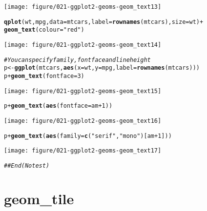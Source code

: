 \documentclass[a4paper,titlepage]{tufte-handout}\usepackage[]{graphicx}\usepackage[]{color}
\makeatletter
\def\maxwidth{ %
  \ifdim\Gin@nat@width>\linewidth
    \linewidth
  \else
    \Gin@nat@width
  \fi
}
\newcommand{\hlnum}[1]{\textcolor[rgb]{0.686,0.059,0.569}{#1}}%
\newcommand{\hlstr}[1]{\textcolor[rgb]{0.192,0.494,0.8}{#1}}%
\newcommand{\hlcom}[1]{\textcolor[rgb]{0.678,0.584,0.686}{\textit{#1}}}%
\newcommand{\hlopt}[1]{\textcolor[rgb]{0,0,0}{#1}}%
\newcommand{\hlstd}[1]{\textcolor[rgb]{0.345,0.345,0.345}{#1}}%
\newcommand{\hlkwb}[1]{\textcolor[rgb]{0.69,0.353,0.396}{#1}}%
\newcommand{\hlkwc}[1]{\textcolor[rgb]{0.333,0.667,0.333}{#1}}%
\newcommand{\hlkwd}[1]{\textcolor[rgb]{0.737,0.353,0.396}{\textbf{#1}}}%
\newenvironment{kframe}{%
 \def\at@end@of@kframe{}%
 \ifinner\ifhmode%
  \def\at@end@of@kframe{\end{minipage}}%
  \begin{minipage}{\columnwidth}%
 \fi\fi%
 \def\FrameCommand##1{\hskip\@totalleftmargin \hskip-\fboxsep
 \colorbox{shadecolor}{##1}\hskip-\fboxsep
     \hskip-\linewidth \hskip-\@totalleftmargin \hskip\columnwidth}%
 \MakeFramed {\advance\hsize-\width
   \@totalleftmargin\z@ \linewidth\hsize
   \@setminipage}}%
 {\par\unskip\endMakeFramed%
 \at@end@of@kframe}
\newenvironment{knitrout}{}{} %
\makeatother
\begin{document}
\begin{knitrout}
\begin{kframe}
\end{kframe}
\texttt{[image: figure/021-ggplot2-geoms-geom\_text13]} 
\begin{kframe}\begin{alltt}
\hlkwd{qplot}\hlstd{(wt, mpg,} \hlkwc{data} \hlstd{= mtcars,} \hlkwc{label} \hlstd{=} \hlkwd{rownames}\hlstd{(mtcars),} \hlkwc{size} \hlstd{= wt)} \hlopt{+}
  \hlkwd{geom_text}\hlstd{(}\hlkwc{colour} \hlstd{=} \hlstr{"red"}\hlstd{)}
\end{alltt}
\end{kframe}
\texttt{[image: figure/021-ggplot2-geoms-geom\_text14]} 
\begin{kframe}\begin{alltt}
\hlcom{# You can specify family, fontface and lineheight}
\hlstd{p} \hlkwb{<-} \hlkwd{ggplot}\hlstd{(mtcars,} \hlkwd{aes}\hlstd{(}\hlkwc{x}\hlstd{=wt,} \hlkwc{y}\hlstd{=mpg,} \hlkwc{label}\hlstd{=}\hlkwd{rownames}\hlstd{(mtcars)))}
\hlstd{p} \hlopt{+} \hlkwd{geom_text}\hlstd{(}\hlkwc{fontface}\hlstd{=}\hlnum{3}\hlstd{)}
\end{alltt}
\end{kframe}
\texttt{[image: figure/021-ggplot2-geoms-geom\_text15]} 
\begin{kframe}\begin{alltt}
\hlstd{p} \hlopt{+} \hlkwd{geom_text}\hlstd{(}\hlkwd{aes}\hlstd{(}\hlkwc{fontface}\hlstd{=am}\hlopt{+}\hlnum{1}\hlstd{))}
\end{alltt}
\end{kframe}
\texttt{[image: figure/021-ggplot2-geoms-geom\_text16]} 
\begin{kframe}\begin{alltt}
\hlstd{p} \hlopt{+} \hlkwd{geom_text}\hlstd{(}\hlkwd{aes}\hlstd{(}\hlkwc{family}\hlstd{=}\hlkwd{c}\hlstd{(}\hlstr{"serif"}\hlstd{,} \hlstr{"mono"}\hlstd{)[am}\hlopt{+}\hlnum{1}\hlstd{]))}
\end{alltt}
\end{kframe}
\texttt{[image: figure/021-ggplot2-geoms-geom\_text17]} 
\begin{kframe}\begin{alltt}
\hlcom{## End(No test)}
\end{alltt}
\end{kframe}
\end{knitrout}



\section{geom\_tile}
\end{document}

